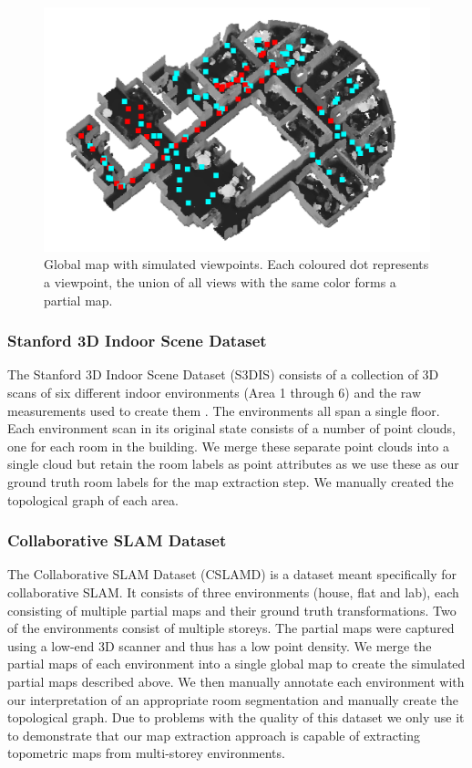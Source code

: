 \pagebreak

\begin{figure}[h]
    \centering
    \includegraphics*[width=.6\textwidth]{./fig/simulated_views.png}
    \caption{Global map with simulated viewpoints. Each coloured dot represents a viewpoint, the union of all views with the same color forms a partial map.}
    \label{fig:simulated}
\end{figure}

\subsubsection{Stanford 3D Indoor Scene Dataset}
The Stanford 3D Indoor Scene Dataset (S3DIS) consists of a collection of 3D scans of six different indoor environments (Area 1 through 6) and the raw measurements used to create them \citep{armeni_3d_2016}. The environments all span a single floor. Each environment scan in its original state consists of a number of point clouds, one for each room in the building. We merge these separate point clouds into a single cloud but retain the room labels as point attributes as we use these as our ground truth room labels for the map extraction step. We manually created the topological graph of each area. 

\subsubsection{Collaborative SLAM Dataset}
The Collaborative SLAM Dataset (CSLAMD) is a dataset meant specifically for collaborative SLAM. It consists of three environments (house, flat and lab), each consisting of multiple partial maps and their ground truth transformations. Two of the environments consist of multiple storeys. The partial maps were captured using a low-end 3D scanner and thus has a low point density. We merge the partial maps of each environment into a single global map to create the simulated partial maps described above. We then manually annotate each environment with our interpretation of an appropriate room segmentation and manually create the topological graph. Due to problems with the quality of this dataset we only use it to demonstrate that our map extraction approach is capable of extracting topometric maps from multi-storey environments.

